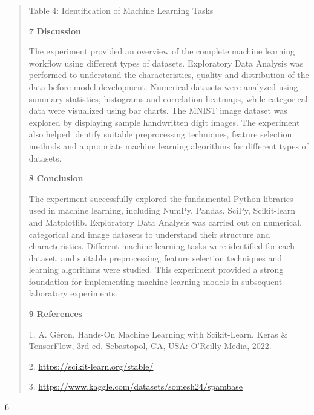 \documentclass[
]{article}
\begin{document}
\begin{quote}
Table 4: Identification of Machine Learning Tasks

\textbf{7} \textbf{Discussion}

The experiment provided an overview of the complete machine learning
workflow using different types of datasets. Exploratory Data Analysis
was performed to understand the characteristics, quality and
distribution of the data before model development. Numerical datasets
were analyzed using summary statistics, histograms and correlation
heatmaps, while categorical data were visualized using bar charts. The
MNIST image dataset was explored by displaying sample handwritten digit
images. The experiment also helped identify suitable preprocessing
techniques, feature selection methods and appropriate machine learning
algorithms for different types of datasets.

\textbf{8} \textbf{Conclusion}

The experiment successfully explored the fundamental Python libraries
used in machine learning, including NumPy, Pandas, SciPy, Scikit-learn
and Matplotlib. Exploratory Data Analysis was carried out on numerical,
categorical and image datasets to understand their structure and
characteristics. Different machine learning tasks were identified for
each dataset, and suitable preprocessing, feature selection techniques
and learning algorithms were studied. This experiment provided a strong
foundation for implementing machine learning models in subsequent
laboratory experiments.

\textbf{9} \textbf{References}

1.
A. Géron, Hands-On Machine Learning with Scikit-Learn, Keras \&
TensorFlow, 3rd ed. Sebastopol, CA, USA: O'Reilly Media, 2022.

2.
\url{https://scikit-learn.org/stable/}

3.
\url{https://www.kaggle.com/datasets/somesh24/spambase}
\end{quote}

6
\end{document}
